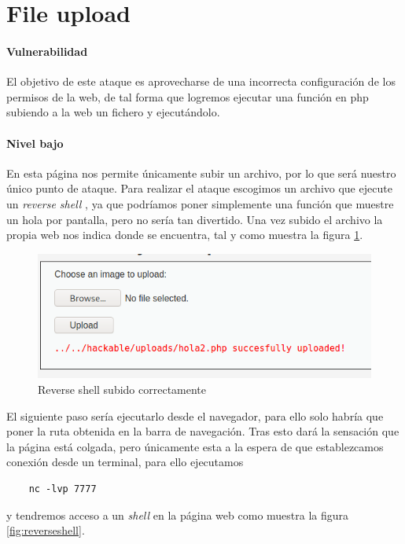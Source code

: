 \section{File upload}\label{sec:upload}
\paragraph{Vulnerabilidad} El objetivo de este ataque es aprovecharse de una incorrecta
configuración de los permisos de la web, de tal forma que logremos ejecutar una función 
en php subiendo a la web un fichero y ejecutándolo.
\paragraph{Nivel bajo} En esta página nos permite únicamente subir un archivo, por lo que será nuestro único
punto de ataque. Para realizar el ataque escogimos un archivo que ejecute un {\it reverse shell} \cite{reverseshell}, ya que podríamos
poner simplemente una función que muestre un hola por pantalla, pero no sería tan divertido. 
Una vez subido el archivo la propia web nos indica donde se encuentra, tal y como muestra la figura \ref{fig:upload}.
\begin{figure}[ht!]
    \centering
    \includegraphics[width=14cm]{img/upload/succes.png}
    \caption{Reverse shell subido correctamente}
    \label{fig:upload}
\end{figure}
El siguiente paso sería ejecutarlo desde el navegador, para ello solo habría que poner 
la ruta obtenida en la barra de navegación. Tras esto dará la sensación que la página está colgada, pero únicamente esta a la espera 
de que establezcamos conexión desde un terminal, para ello ejecutamos
\begin{lstlisting}
    nc -lvp 7777
\end{lstlisting} 
y tendremos acceso a un {\it shell} en la página web como muestra la figura \ref{fig:reverseshell}.

